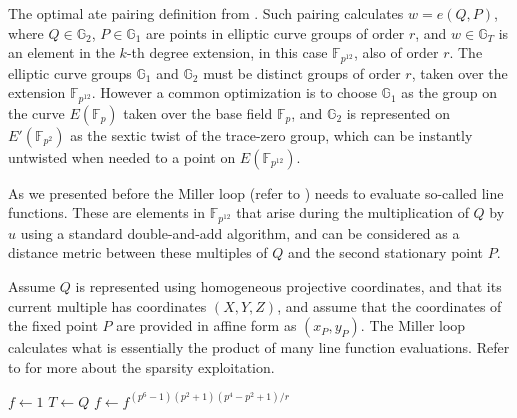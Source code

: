 The optimal ate pairing definition from . Such pairing calculates $w = e(Q, P)$, where $Q \in \mathbb{G}_2$, $P \in \mathbb{G}_1$ are points in elliptic curve groups of order $r$, and
$w \in \mathbb{G}_T$ is an element in the $k$-th degree extension, in this case
$\mathbb{F}_{p^{12}}$, also of order $r$. The elliptic curve groups $\mathbb{G}_1$
and $\mathbb{G}_2$ must be distinct groups of order $r$, taken over the extension
$\mathbb{F}_{p^{12}}$. However a common optimization is to choose $\mathbb{G}_1$
as the group on the curve $E(\mathbb{F}_p)$ taken over the base field $\mathbb{F}_p$,
and $\mathbb{G}_2$ is represented on $E'(\mathbb{F}_{p^2})$ as the sextic twist of
the trace-zero group, which can be instantly untwisted when needed to a point on
$E(\mathbb{F}_{p^{12}})$.

As we presented before the Miller loop (refer to ) needs to evaluate so-called line functions. These are elements in $\mathbb{F}_{p^{12}}$ that arise during the multiplication of $Q$  by $u$ using a standard double-and-add algorithm, and can be considered as a
distance metric between these multiples of $Q$ and the second stationary point $P$.

Assume $Q$ is represented using homogeneous projective coordinates, and that its
current multiple has coordinates $(X, Y, Z)$, and assume that the coordinates of
the fixed point $P$ are provided in affine form as $(x_P, y_P)$. The Miller loop
calculates what is essentially the product of many line function evaluations. Refer to \cite{Scott2019PairingImplementationRevisited} for more about the sparsity exploitation.
	
\begin{algorithm}
	\label{alg:atepairingoverbls12curve}
	\caption{Ate pairing on BLS12 curve, refer to \cite{Scott2019PairingImplementationRevisited}}
	$f \leftarrow 1$\;
	$T \leftarrow Q$\;
	$f \leftarrow f^{(p^6 - 1)(p^2 + 1)(p^4 - p^2 + 1)/r}$\;
\end{algorithm}
	

